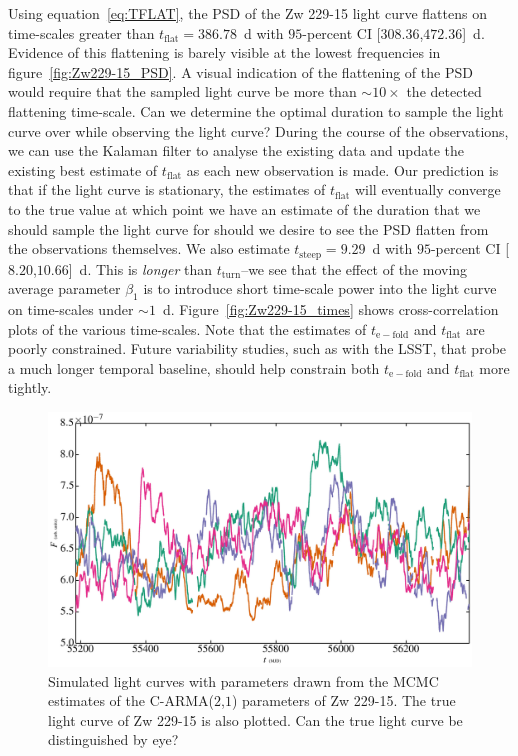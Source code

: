 \documentclass[a4paper,fleqn,usenatbib]{mnras}
\begin{document}
Using equation~\eqref{eq:TFLAT}, the PSD of the Zw 229-15 light curve flattens on time-scales greater than $t_{\mathrm{flat}} = 386.78$~d with $95$-percent CI [$308.36$,$472.36$]~d. Evidence of this flattening is barely visible at the lowest frequencies in figure~\ref{fig:Zw229-15_PSD}. A visual indication of the flattening of the PSD would require that the sampled light curve be more than $\sim 10 \times$ the detected flattening time-scale. Can we determine the optimal duration to sample the light curve over while observing the light curve? During the course of the observations, we can use the Kalaman filter to analyse the existing data and update the existing best estimate of  $t_{\mathrm{flat}}$ as each new observation is made. Our prediction is that if the light curve is stationary, the estimates of $t_{\mathrm{flat}}$ will eventually converge to the true value at which point we have an estimate of the duration that we should sample the light curve for should we desire to see the PSD flatten from the observations themselves. We also estimate $t_{\mathrm{steep}} = 9.29$~d with $95$-percent CI [$8.20$,$10.66$]~d. This is \textit{longer} than $t_{\mathrm{turn}}$--we see that the effect of the moving average parameter $\beta_{1}$ is to introduce short time-scale power into the light curve on time-scales under $\sim 1$~d. Figure~\ref{fig:Zw229-15_times} shows cross-correlation plots of the various time-scales. Note that the estimates of $t_\mathrm{e-fold}$ and $t_{\mathrm{flat}}$ are poorly constrained. Future variability studies, such as with the LSST, that probe a much longer temporal baseline, should help constrain both $t_{\mathrm{e-fold}}$ and $t_{\mathrm{flat}}$ more tightly.

\begin{figure}
	\includegraphics[width=\columnwidth]{images/Zw229-15_mockLC.jpg}
    \caption{Simulated light curves with parameters drawn from the MCMC estimates of the C-ARMA($2$,$1$) parameters of Zw 229-15. The true light curve of Zw 229-15 is also plotted. Can the true light curve be distinguished by eye?}  
    \label{fig:Zw229-15_mock}
\end{figure}
\end{document}
